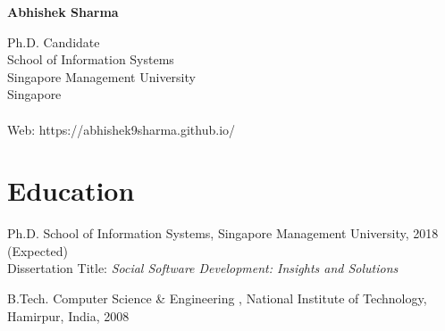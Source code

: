 \documentclass[12pt,letterpaper]{article}
\newcommand{\myname}{Abhishek Sharma}
\newcommand{\namefont}[1]{{\normalfont\bfseries\Huge{#1}}}
\begin{document}
\raggedright

\namefont{\myname}

\vspace{1em}
\begin{minipage}[t]{0.495\textwidth}
Ph.D. Candidate\\
  School of Information Systems\\
Singapore Management University \\
Singapore\\
\\
Web: https://abhishek9sharma.github.io/
\end{minipage}
%
\vspace{0.5em}



\section*{Education}

\begin{tablist}
	
\item[Ph.D.] \tab School of Information Systems, Singapore Management University, 2018 (Expected) \\
                  Dissertation Title: \textit{Social Software Development: Insights and Solutions} \\
                  
                 

\item[B.Tech.]  \tab Computer Science \& Engineering , National Institute of Technology,  Hamirpur, India, 2008

\end{tablist}
\end{document}
